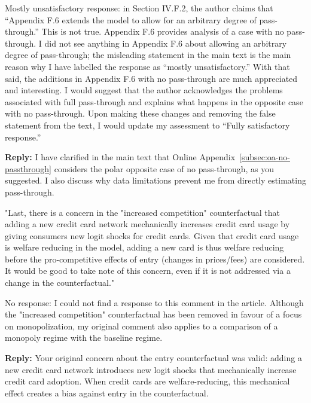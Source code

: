 \documentclass[main.tex]{subfiles}
\begin{document}
\begin{refsection}
\begin{refcommentnoclear}
Mostly unsatisfactory response: in Section IV.F.2, the author claims that “Appendix F.6 extends the model to allow for an arbitrary degree of pass- through.” This is not true.
Appendix F.6 provides analysis of a case with no pass-through.
I did not see anything in Appendix F.6 about allowing an arbitrary degree of pass-through; the misleading statement in the main text is the main reason why I have labelled the response as “mostly unsatisfactory.” With that said, the additions in Appendix F.6 with no pass-through are much appreciated and interesting.
I would suggest that the author acknowledges the problems associated with full pass-through and explains what happens in the opposite case with no pass-through.
Upon making these changes and removing the false statement from the text, I would update my assessment to “Fully satisfactory response.”

\end{refcommentnoclear}

\textbf{Reply:} I have clarified in the main text that Online Appendix~\ref{subsec:oa-no-passthrough} considers the polar opposite case of no pass-through, as you suggested.
I also discuss why data limitations prevent me from directly estimating pass-through.

\begin{refcommentnoclear}
"Last, there is a concern in the "increased competition" counterfactual that adding a new credit card network mechanically increases credit card usage by giving consumers new logit shocks for credit cards.
Given that credit card usage is welfare reducing in the model, adding a new card is thus welfare reducing before the pro-competitive effects of entry (changes in prices/fees) are considered.
It would be good to take note of this concern, even if it is not addressed via a change in the counterfactual."

No response: I could not find a response to this comment in the article.
Although the "increased competition" counterfactual has been removed in favour of a focus on monopolization, my original comment also applies to a comparison of a monopoly regime with the baseline regime.
\end{refcommentnoclear}

\textbf{Reply:} Your original concern about the entry counterfactual was valid: adding a new credit card network introduces new logit shocks that mechanically increase credit card adoption.
When credit cards are welfare-reducing, this mechanical effect creates a bias against entry in the counterfactual.


\end{refsection}
\end{document}
